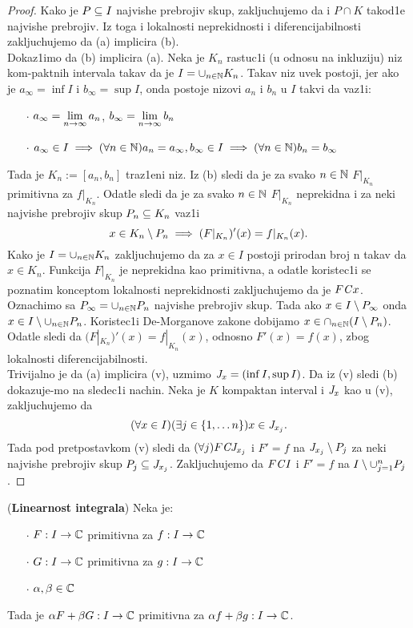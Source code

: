 \documentclass[../main.tex]{subfiles}
\begin{document}
\begin{proof}
Kako je $P\subseteq I$ najvishe prebrojiv skup, zakljuchujemo da i $P\cap K$ takod1e najvishe prebrojiv. 
Iz toga i lokalnosti neprekidnosti i diferencijabilnosti zakljuchujemo da (a) implicira (b).\\
Dokaz1imo da (b) implicira (a). Neka je $K_n$ rastuc1i (u odnosu na inkluziju) niz kom-paktnih intervala takav da je $I=\cup_{n\in \mathbb{N}} K_n$.
Takav niz uvek postoji, jer ako je $a_{\infty} = \inf I$ i $b_{\infty} = \sup I$,
onda postoje nizovi $a_n$ i $b_n$ u $I$ takvi da vaz1i:
\begin{itemize}
        \item[$\cdot$] $a_{\infty} = \displaystyle{\lim_{n\to \infty}a_n}$,
        $b_{\infty} = \displaystyle{\lim_{n\to \infty}b_n}$
        \item[$\cdot$] $a_{\infty} \in I \implies (\forall n \in \mathbb{N}) a_n=a_{\infty}, b_{\infty} \in I \implies (\forall n \in \mathbb{N}) b_n=b_{\infty}$
\end{itemize} 
Tada je $K_n:=[a_n,b_n]$ traz1eni niz. Iz (b) sledi da je za svako $n\in \mathbb{N}$ $F|_{K_n}$ primitivna za $f|_{K_n}$.
Odatle sledi da je za svako $n\in \mathbb{N}$ $F|_{K_n}$ neprekidna i za neki najvishe prebrojiv skup $P_n\subseteq K_n$
vaz1i $$x\in K_n \setminus P_n \implies (F|_{K_n})'(x)=f|_{K_n}(x).$$ 
Kako je $I=\cup_{n\in \mathbb{N}} K_n$ zakljuchujemo da za $x \in I$ postoji prirodan broj n takav da $x \in K_n$.
Funkcija $F|_{K_n}$ je neprekidna kao primitivna, a odatle koristec1i se poznatim konceptom lokalnosti neprekidnosti zakljuchujemo da je $F\mathit{C} x$.
Oznachimo sa $P_{\infty}=\cup_{n\in \mathbb{N}}P_n$ najvishe prebrojiv skup. Tada ako $x\in I \setminus P_{\infty}$ onda $x\in I \setminus \cup_{n\in \mathbb{N}}P_n$.
Koristec1i De-Morganove zakone dobijamo $x\in \cap_{n\in \mathbb{N}}(I\setminus P_n)$. Odatle sledi da $(F|_{K_n})'(x)=f|_{K_n}(x)$, odnosno $F'(x)=f(x)$, zbog lokalnosti diferencijabilnosti.\\
Trivijalno je da (a) implicira (v), uzmimo $\mathit{J}_x = (\inf I, \sup I)$. Da iz (v) sledi (b) dokazuje-mo na sledec1i nachin. Neka je $K$ kompaktan interval i $\mathit{J}_x$ kao u (v),
zakljuchujemo da $$(\forall x \in I)(\exists j \in \{1, \dots n\}) x\in \mathit{J}_{x_j}.$$
Tada pod pretpostavkom (v) sledi da $(\forall j) F\mathit{C} \mathit{J}_{x_j}$ i $F'=f$ na $\mathit{J}_{x_j}\setminus P_j$ za neki najvishe prebrojiv skup $P_j \subseteq \mathit{J}_{x_j}$.
Zakljuchujemo da $F\mathit{C} I$ i $F'=f $ na $I\setminus
\cup_{j=1}^n P_j$.
\end{proof}
\begin{tvr}
(\textbf{Linearnost integrala}) Neka je:
\begin{itemize}
        \item[$\cdot$] $F:I\to \mathbb{C}$ primitivna za $f:I\to \mathbb{C}$
        \item[$\cdot$] $G:I\to \mathbb{C}$ primitivna za $g:I\to \mathbb{C}$
        \item[$\cdot$] $\alpha, \beta \in \mathbb{C}$
\end{itemize}
Tada je $\alpha F + \beta G:I\to \mathbb{C}$ primitivna za $\alpha f + \beta g: I \to \mathbb{C}$.
\end{tvr}
\end{document}
